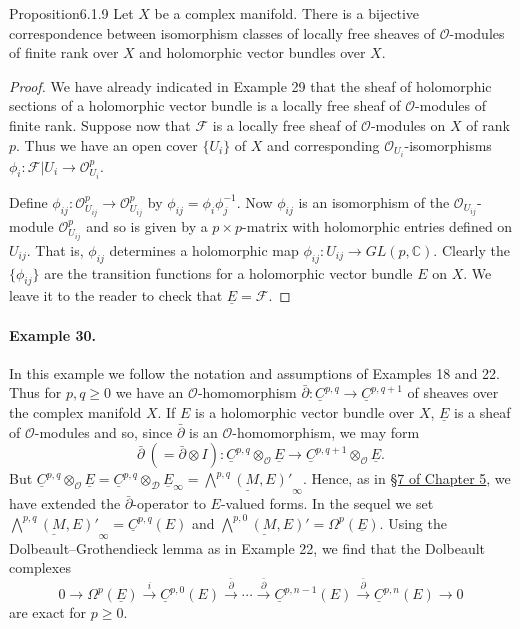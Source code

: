 \begin{originaltheorem}{Proposition}{6.1.9}
Let $X$ be a complex manifold. There is a bijective correspondence between isomorphism classes of locally free sheaves of $\mathcal O$-modules of finite rank over $X$ and holomorphic vector bundles over $X$.
\end{originaltheorem}
\begin{proof}
We have already indicated in Example 29 that the sheaf of holomorphic sections of a holomorphic vector bundle is a locally free sheaf of $\mathcal O$-modules of finite rank. Suppose now that $\mathcal F$ is a locally free sheaf of $\mathcal O$-modules on $X$ of rank $p$. Thus we have an open cover $\{U_i\}$ of $X$ and corresponding $\mathcal O_{U_i}$-isomorphisms $\phi_i:\mathcal F|U_i\to\mathcal O_{U_i}^p$.

Define $\phi_{ij}:\mathcal O_{U_{ij}}^p\to\mathcal O_{U_{ij}}^p$ by $\phi_{ij}=\phi_i\phi_j^{-1}$. Now $\phi_{ij}$ is an isomorphism of the $\mathcal O_{U_{ij}}$-module $\mathcal O_{U_{ij}}^p$ and so is given by a $p\times p$-matrix with holomorphic entries defined on $U_{ij}$. That is, $\phi_{ij}$ determines a holomorphic map $\phi_{ij}:U_{ij}\to GL(p,\mathbb C)$. Clearly the $\{\phi_{ij}\}$ are the transition functions for a holomorphic vector bundle $E$ on $X$. We leave it to the reader to check that $\underline E=\mathcal F$.
\end{proof}
\paragraph{Example 30.}
In this example we follow the notation and assumptions of Examples 18 and 22. Thus for $p,q\geq0$ we have an $\mathcal O$-homomorphism $\bar\partial:\underline C^{p,q}\to\underline C^{p,q+1}$ of sheaves over the complex manifold $X$. If $E$ is a holomorphic vector bundle over $X$, $\underline E$ is a sheaf of $\mathcal O$-modules and so, since $\bar\partial$ is an $\mathcal O$-homomorphism, we may form
\[
\bar\partial\ (=\bar\partial\otimes I):\underline C^{p,q}\otimes_{\mathcal O}\underline E\to\underline C^{p,q+1}\otimes_{\mathcal O}\underline E.
\]
But $\underline C^{p,q}\otimes_{\mathcal O}\underline E=\underline C^{p,q}\otimes_{\mathscr D}\underline E_\infty=\underline{\bigwedge^{p,q}(M,E)'}_\infty$. Hence, as in \hyperref[sec:5:7]{\S7 of Chapter 5}, we have extended the $\bar\partial$-operator to $E$-valued forms. In the sequel we set $\underline{\bigwedge^{p,q}(M,E)'}_\infty=\underline C^{p,q}(E)$ and $\underline{\bigwedge^{p,0}(M,E)'}=\Omega^p(\underline E)$. Using the Dolbeault--Grothendieck lemma as in Example 22, we find that the Dolbeault complexes
\[
0\to\Omega^p(\underline E)\xrightarrow{i}\underline C^{p,0}(E)\xrightarrow{\bar\partial}\cdots\xrightarrow{\bar\partial}\underline C^{p,n-1}(E)\xrightarrow{\bar\partial}\underline C^{p,n}(E)\to0
\]
are exact for $p\geq0$.

